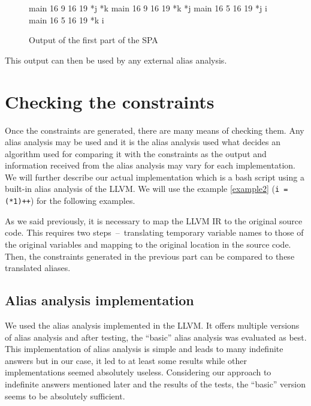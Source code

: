 \begin{figure}
\caption{Output of the first part of the SPA}
\label{first-part-output}
\begin{code}
main 16 9 16 19 *j *k
main 16 9 16 19 *k *j
main 16 5 16 19 *j i
main 16 5 16 19 *k i
\end{code}
\end{figure}

This output can then be used by any external alias analysis.

\section{Checking the constraints}
Once the constraints are generated, there are many means of checking them. Any alias analysis may be used and it is the alias analysis used what decides an algorithm used for comparing it with the constraints as the output and information received from the alias analysis may vary for each implementation. We will further describe our actual implementation which is a bash script using a built-in alias analysis of the LLVM. We will use the example \ref{example2} (\verb|i = (*1)++|) for the following examples.

As we said previously, it is necessary to map the LLVM IR to the original source code. This requires two steps~--~translating temporary variable names to those of the original variables and mapping to the original location in the source code. Then, the constraints generated in the previous part can be compared to these translated aliases.

\subsection{Alias analysis implementation}
We used the alias analysis implemented in the LLVM. It offers multiple versions of alias analysis and after testing, the ``basic'' alias analysis was evaluated as best. This implementation of alias analysis is simple and leads to many indefinite answers but in our case, it led to at least some results while other implementations seemed absolutely useless. Considering our approach to indefinite answers mentioned later and the results of the tests, the ``basic'' version seems to be absolutely sufficient.

